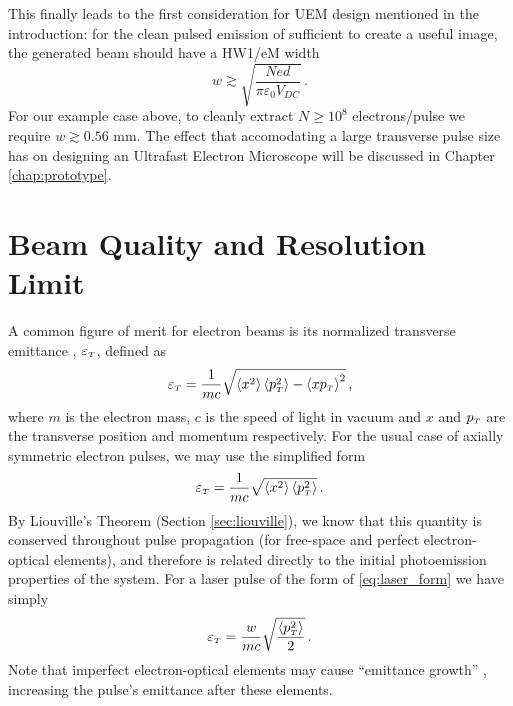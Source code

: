 This finally leads to the first consideration for UEM design mentioned in the introduction: for the clean pulsed emission of sufficient to create a useful image, the generated beam should have a HW1/eM width 
\begin{equation} \label{eq:minimum_w}
  w \gtrsim \sqrt{\frac{N e d}{\pi \varepsilon_0 V_{DC}}} \,\text{.}
\end{equation}
For our example case above, to cleanly extract $N \ge 10^8$ electrons/pulse we require $w \gtrsim 0.56 \text{ mm}$.
The effect that accomodating a large transverse pulse size has on designing an Ultrafast Electron Microscope will be discussed in Chapter \ref{chap:prototype}. 

\section{Beam Quality and Resolution Limit} \label{sec:must_reduce_transverse_momentum}

A common figure of merit for electron beams is its normalized transverse emittance \cite{jensen_emittance_2010}, $\varepsilon_{{\scriptscriptstyle T}}$, defined as 
\begin{equation}
  \varepsilon_{{\scriptscriptstyle T}} = \frac{1}{m c} \sqrt{ \left < x^2 \right > \left < p_{{\scriptscriptstyle T}}^2 \right > - \left < x p_{{\scriptscriptstyle T}} \right >^2 } \,\text{,}
\end{equation}
where $m$ is the electron mass, $c$ is the speed of light in vacuum and $x$ and $p_{{\scriptscriptstyle T}}$ are the transverse position and momentum respectively.
For the usual case of axially symmetric electron pulses, we may use the simplified form
\begin{equation} \label{eq:emittance_definition}
  \varepsilon_{{\scriptscriptstyle T}} = \frac{1}{m c} \sqrt{ \left < x^2 \right > \left < p_{{\scriptscriptstyle T}}^2 \right > } \,\text{.}
\end{equation}
By Liouville's Theorem (Section \ref{sec:liouville}), we know that this quantity is conserved throughout pulse propagation (for free-space and perfect electron-optical elements), and therefore is related directly to the initial photoemission properties of the system.
For a laser pulse of the form of \ref{eq:laser_form} we have simply
\begin{equation} \label{eq:emittance_definition_w}
  \varepsilon_{{\scriptscriptstyle T}} = \frac{w}{m c} \sqrt{ \frac{\left < p_{{\scriptscriptstyle T}}^2 \right >}{2} } \,\text{.}
\end{equation}
Note that imperfect electron-optical elements may cause ``emittance growth'' \cite{oshea_reversible_1998}, increasing the pulse's emittance after these elements.

